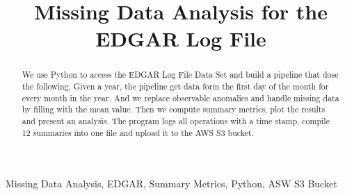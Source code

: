\documentclass[conference]{IEEEtran}
\begin{document}
\title{Missing Data Analysis for the EDGAR Log File}
%
\author{
}
\maketitle
\begin{abstract}
We use Python to access the EDGAR Log File Data Set and build a pipeline that dose the following. Given a year, the pipeline get data form the first day of the month for every month in the year. And we replace observable anomalies and handle missing data by filling with the mean value. Then we compute summary metrics, plot the results and present an analysis. The program logs all operations with a time stamp, compile 12 summaries into one file and upload it to the AWS S3 bucket.
\end{abstract}
\begin{keywords}
Missing Data Analysis, EDGAR, Summary Metrics, Python, ASW S3 Bucket
\end{keywords}
\IEEEpeerreviewmaketitle
%
\end{document}
